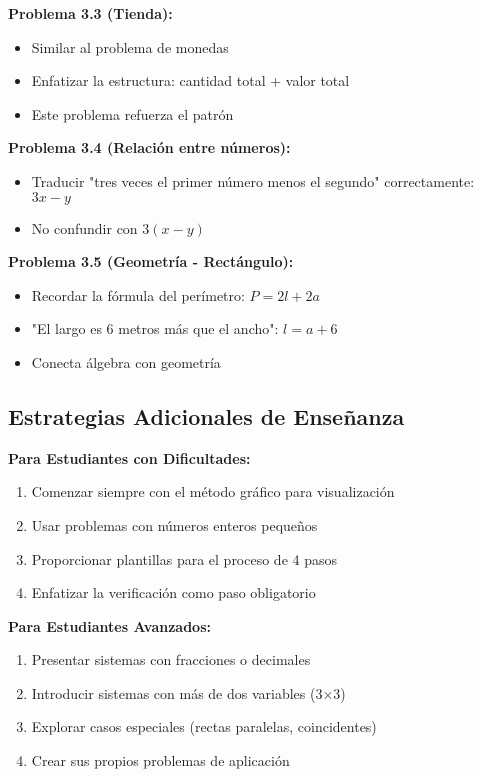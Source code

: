 \textbf{Problema 3.3 (Tienda):}
\begin{itemize}
    \item Similar al problema de monedas
    \item Enfatizar la estructura: cantidad total + valor total
    \item Este problema refuerza el patrón
\end{itemize}

\textbf{Problema 3.4 (Relación entre números):}
\begin{itemize}
    \item Traducir "tres veces el primer número menos el segundo" correctamente: $3x - y$
    \item No confundir con $3(x - y)$
\end{itemize}

\textbf{Problema 3.5 (Geometría - Rectángulo):}
\begin{itemize}
    \item Recordar la fórmula del perímetro: $P = 2l + 2a$
    \item "El largo es 6 metros más que el ancho": $l = a + 6$
    \item Conecta álgebra con geometría
\end{itemize}

\subsection*{Estrategias Adicionales de Enseñanza}

\textbf{Para Estudiantes con Dificultades:}

\begin{enumerate}
    \item Comenzar siempre con el método gráfico para visualización
    \item Usar problemas con números enteros pequeños
    \item Proporcionar plantillas para el proceso de 4 pasos
    \item Enfatizar la verificación como paso obligatorio
\end{enumerate}

\textbf{Para Estudiantes Avanzados:}

\begin{enumerate}
    \item Presentar sistemas con fracciones o decimales
    \item Introducir sistemas con más de dos variables (3×3)
    \item Explorar casos especiales (rectas paralelas, coincidentes)
    \item Crear sus propios problemas de aplicación
\end{enumerate}

